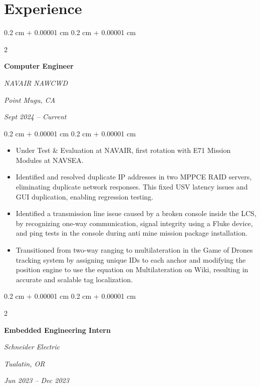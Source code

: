 \documentclass[10pt, letterpaper]{article}
\newenvironment{highlights}{
    \begin{itemize}[
        topsep=0.10 cm,
        parsep=0.10 cm,
        partopsep=0pt,
        itemsep=0pt,
        leftmargin=0.4 cm + 10pt
    ]
}{
    \end{itemize}
} %
\newenvironment{onecolentry}{
    \begin{adjustwidth}{
        0.2 cm + 0.00001 cm
    }{
        0.2 cm + 0.00001 cm
    }
}{
    \end{adjustwidth}
} %
\newenvironment{twocolentry}[2][]{
    \onecolentry
    \def\secondColumn{#2}
    \setcolumnwidth{\fill, 4.5 cm}
    \begin{paracol}{2}
}{
    \switchcolumn \raggedleft \secondColumn
    \end{paracol}
    \endonecolentry
} %
\begin{document}
    \section{Experience}
        
        \begin{twocolentry}{
        \textit{Point Mugu, CA}    
            
        \textit{Sept 2024 – Current}}
            \textbf{Computer Engineer}
            
            \textit{NAVAIR NAWCWD}
        \end{twocolentry}

        \vspace{0.10 cm}
        \begin{onecolentry}
            \begin{highlights}
                \item Under Test \& Evaluation at NAVAIR, first rotation with E71 Mission Modules at NAVSEA.
                \item Identified and resolved duplicate IP addresses in two MPPCE RAID servers, eliminating duplicate network responses. This fixed USV latency issues and GUI duplication, enabling regression testing.
                \item Identified a transmission line issue caused by a broken console inside the LCS, by recognizing one-way communication, signal integrity using a Fluke device, and ping tests in the console during anti mine mission package installation. 
                \item Transitioned from two-way ranging to multilateration in the Game of Drones tracking system by assigning unique IDs to each anchor and modifying the position engine to use the equation on Multilateration on Wiki, resulting in accurate and scalable tag localization.
            \end{highlights}
        \end{onecolentry}

        \vspace{0.2 cm}

        \begin{twocolentry}{
        \textit{Tualatin, OR}    
            
        \textit{Jun 2023 – Dec 2023}}
            \textbf{Embedded Engineering Intern}
            
            \textit{Schneider Electric}
        \end{twocolentry}
\end{document}
